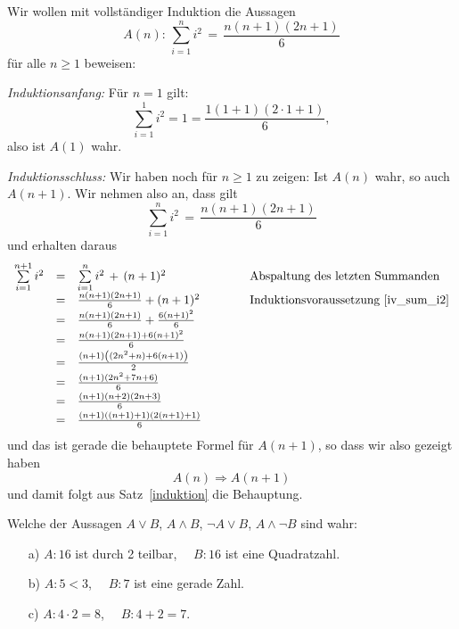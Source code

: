 \begin{beispiel} Wir wollen mit vollständiger Induktion die Aussagen 
  	$$ A(n) : \, \sum_{i=1}^n i^2 \, = \, \frac { n(n+1)(2n+1)}{6}  $$
für alle $n \geq 1$ beweisen:

\textit{Induktionsanfang:} Für $n = 1$ gilt: 
  	$$ \sum_{i = 1}^1 i^2 = 1 = \frac {1(1+1)(2 \cdot 1 + 1)}{6}, $$
also ist $A(1)$ wahr.

\textit{Induktionsschluss:} Wir haben noch für $n \geq 1$ zu zeigen: Ist $A(n)$ wahr, so auch $A(n+1)$. 
Wir nehmen also an, dass gilt
  	\begin{equation}\label{iv_sum_i2} \sum_{i=1}^n i^2 \, = \, \frac { n(n+1)(2n+1)}{6}  \end{equation}
und erhalten daraus
  	$$ \begin{array} {l c l c l}
   	\sum\limits_{i=1}^{n+1} i^2 & = & \sum\limits_{i=1}^n i^2 \, + \, (n+1)^2 & \qquad &  \textrm{Abspaltung des 
  	letzten Summanden} \\[0.2em]
     	& = & \frac { n(n+1)(2n+1)}{6}  + (n+1)^2 & & \textrm{Induktionsvoraussetzung~\ref{iv_sum_i2}} \\[0.2em]
     	& = & \frac { n(n+1)(2n+1)}{6} + \frac {6(n+1)^2}{6} & & \\[0.2em]
     	& = & \frac {n(n+1)(2n+1) + 6(n+1)^2}{6} & & \\[0.2em]
     	& = & \frac {(n+1)\left( (2n^2+n) + 6(n+1)\right)}{2} & & \\[0.2em]
     	& = & \frac {(n+1)(2n^2+7n+6)}{6} & & \\[0.2em]
     	& = & \frac {(n+1)(n+2)(2n+3)}{6} & & \\[0.2em]
     	& = & \frac {(n+1)((n+1)+1)(2(n+1)+1)}{6} & &
    	\end{array} $$
und das ist gerade die behauptete Formel für $A(n+1)$, so dass wir also gezeigt haben 
  	$$ A(n) \Longrightarrow A(n+1) $$
und damit folgt aus Satz~\ref{induktion} die Behauptung.
\end{beispiel} 


\bigbreak

\begin{aufgabe}
Welche der Aussagen $A \vee B$, $A \wedge B$, $\neg A \vee B$,
$A \wedge \neg B$ sind wahr:
\begin{itemize}
\item[a)] $A: 16 $ ist durch 2 teilbar, $\quad B: 16$ ist eine Quadratzahl.
\item[b)] $A: 5 < 3$, $\quad B: 7$ ist eine gerade Zahl.
\item[c)] $A: 4 \cdot 2 = 8$, $\quad B: 4 + 2 = 7$.
\end{itemize}
\end{aufgabe}

